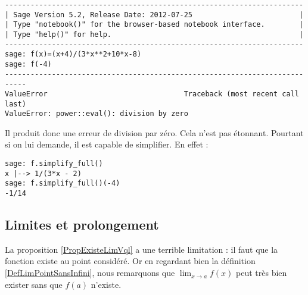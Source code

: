 \begin{verbatim}
----------------------------------------------------------------------
| Sage Version 5.2, Release Date: 2012-07-25                         |
| Type "notebook()" for the browser-based notebook interface.        |
| Type "help()" for help.                                            |
----------------------------------------------------------------------
sage: f(x)=(x+4)/(3*x**2+10*x-8)                                                                                              
sage: f(-4)
---------------------------------------------------------------------------
ValueError                                Traceback (most recent call last)
ValueError: power::eval(): division by zero
\end{verbatim}
Il produit donc une erreur de division par zéro. Cela n'est pas étonnant. Pourtant si on lui demande, il est capable de simplifier. En effet :
\begin{verbatim}
sage: f.simplify_full()                                                                                                        
x |--> 1/(3*x - 2)                                                                                                                                           
sage: f.simplify_full()(-4)                                                                                                                                  
-1/14                                                                                                                                                        
\end{verbatim}

\subsection{Limites et prolongement}

La proposition \ref{PropExisteLimVql} a une terrible limitation : il faut que la fonction existe au point considéré. Or en regardant bien la définition \ref{DefLimPointSansInfini}, nous remarquons que $\lim_{x\to a}f(x)$ peut très bien exister sans que $f(a)$ n'existe.

